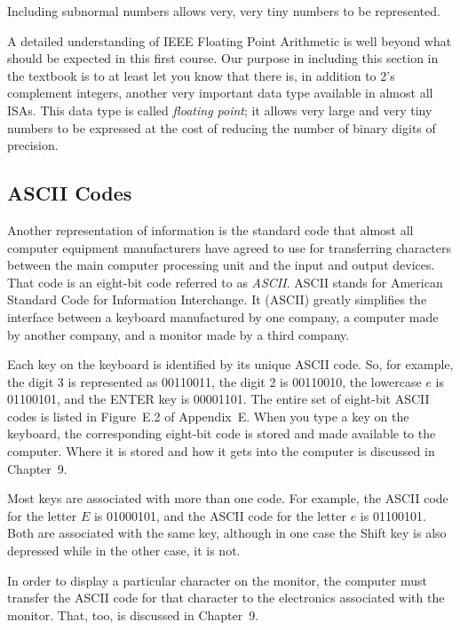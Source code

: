 \documentclass{patt}
\begin{document}
Including subnormal numbers allows very, very tiny numbers to be represented.

\endgroup


\bigskip
\bigskip

A detailed understanding of IEEE Floating Point Arithmetic is
well beyond what should be expected in this first course.  Our purpose in
including this section in the textbook is to at least let
you know that there is, in addition to 2's complement integers,
another very important data type available in almost all ISAs.
This data type is called {\em floating point}; it allows very
large and very tiny numbers to be expressed at the cost of
reducing the number of binary digits of precision.

\smallskip
\enlargethispage{-2\baselineskip}

\subsection{ASCII Codes}

Another representation of information is the standard code that almost
all  computer equipment manufacturers have agreed
to use for transferring characters between the main computer
processing unit and the input and output devices. That code is an
eight-bit code referred to as {\em ASCII}.  ASCII stands for American
Standard Code for Information Interchange.  It (ASCII) greatly
simplifies the interface between a keyboard manufactured by one
company, a computer made by another company, and a monitor made by a
third company.

Each key on the keyboard is identified by its unique ASCII code.  So,
for example, the digit 3 is represented as 00110011, the digit 2 is 00110010, 
the lowercase $e$ is 01100101, and
the ENTER key is 00001101.  The entire set of eight-bit ASCII
codes is listed in Figure~E.2 of Appendix~E. When you type a key on
the keyboard, the corresponding eight-bit code is stored and made
available to the computer.  Where it is stored and how it gets into
the computer is discussed in Chapter~9.

Most keys are associated with more than one code.  For example, the
ASCII code for the letter $E$ is 01000101, and the ASCII code for the
letter $e$ is 01100101.  Both are associated with the same key,
although in one case the Shift key is also depressed while in the
other case, it is not.

In order to display a particular character on the monitor,
the computer must transfer the ASCII code for that character
to the electronics associated with the monitor.  That, too,
is discussed in Chapter~9.
\end{document}

